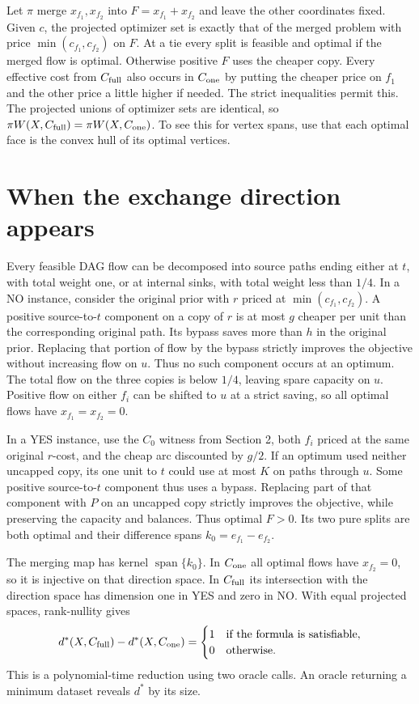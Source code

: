 \documentclass[11pt,a4paper]{amsart}
\begin{document}
Let $\pi$ merge $x_{f_1},x_{f_2}$ into $F=x_{f_1}+x_{f_2}$ and leave the other coordinates fixed. Given $c$, the projected optimizer set is exactly that of the merged problem with price $\min(c_{f_1},c_{f_2})$ on $F$. At a tie every split is feasible and optimal if the merged flow is optimal. Otherwise positive $F$ uses the cheaper copy. Every effective cost from $C_{\rm full}$ also occurs in $C_{\rm one}$ by putting the cheaper price on $f_1$ and the other price a little higher if needed. The strict inequalities permit this. The projected unions of optimizer sets are identical, so $\pi W(X,C_{\rm full})=\pi W(X,C_{\rm one})$. To see this for vertex spans, use that each optimal face is the convex hull of its optimal vertices.

\section{When the exchange direction appears}
Every feasible DAG flow can be decomposed into source paths ending either at $t$, with total weight one, or at internal sinks, with total weight less than $1/4$. In a NO instance, consider the original prior with $r$ priced at $\min(c_{f_1},c_{f_2})$. A positive source-to-$t$ component on a copy of $r$ is at most $g$ cheaper per unit than the corresponding original path. Its bypass saves more than $h$ in the original prior. Replacing that portion of flow by the bypass strictly improves the objective without increasing flow on $u$. Thus no such component occurs at an optimum. The total flow on the three copies is below $1/4$, leaving spare capacity on $u$. Positive flow on either $f_i$ can be shifted to $u$ at a strict saving, so all optimal flows have $x_{f_1}=x_{f_2}=0$.

In a YES instance, use the $C_0$ witness from Section 2, both $f_i$ priced at the same original $r$-cost, and the cheap arc discounted by $g/2$. If an optimum used neither uncapped copy, its one unit to $t$ could use at most $K$ on paths through $u$. Some positive source-to-$t$ component thus uses a bypass. Replacing part of that component with $P$ on an uncapped copy strictly improves the objective, while preserving the capacity and balances. Thus optimal $F>0$. Its two pure splits are both optimal and their difference spans $k_0=e_{f_1}-e_{f_2}$.

The merging map has kernel $\operatorname{span}\{k_0\}$. In $C_{\rm one}$ all optimal flows have $x_{f_2}=0$, so it is injective on that direction space. In $C_{\rm full}$ its intersection with the direction space has dimension one in YES and zero in NO. With equal projected spaces, rank-nullity gives
\[
 d^*(X,C_{\rm full})-d^*(X,C_{\rm one})=
 \begin{cases}1 &\text{if the formula is satisfiable},\\0 &\text{otherwise}.\end{cases}
\]
This is a polynomial-time reduction using two oracle calls. An oracle returning a minimum dataset reveals $d^*$ by its size.
\end{document}
